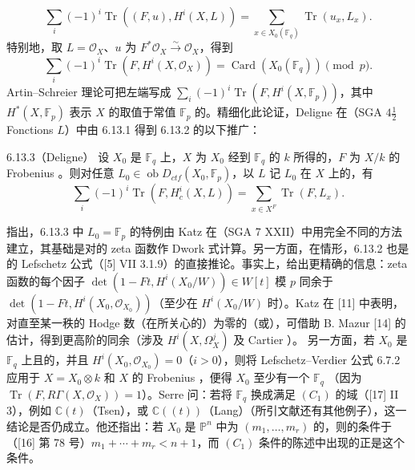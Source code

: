 \[\sum_i(-1)^i\operatorname{Tr}((F,u),H^i(X,L))=\sum_{x\in X_0(\mathbb F_q)}\operatorname{Tr}(u_x,L_x).\tag{6.13.1}\]
特别地，取 $L=\mathcal O_X$、$u$ 为 $F^*\mathcal O_X\xrightarrow\sim\mathcal O_X$，得到
\[\sum_i(-1)^i\operatorname{Tr}(F,H^i(X,\mathcal O_X))=\operatorname{Card}(X_0(\mathbb F_q))\pmod p.\tag{6.13.2}\]
Artin--Schreier 理论可把左端写成 $\sum_i(-1)^i\operatorname{Tr}(F,H^i(X,\mathbb F_p))$，其中 $H^*(X,\mathbb F_p)$ 表示 $X$ 的取值于常值 $\mathbb F_p$ 的。精细化此论证，Deligne 在（SGA $4\frac12$ Fonctions $L$）中由 6.13.1 得到 6.13.2 的以下推广：
\begin{SGAresult}{}{6.13.3（Deligne）}
设 $X_0$ 是 $\mathbb F_q$ 上，$X$ 为 $X_0$ 经到 $\mathbb F_q$ 的 $k$ 所得的，$F$ 为 $X/k$ 的 Frobenius 。则对任意 $L_0\in\operatorname{ob}D_{ctf}(X_0,\mathbb F_p)$，以 $L$ 记 $L_0$ 在 $X$ 上的，有
\[\sum_i(-1)^i\operatorname{Tr}(F,H_c^i(X,L))=\sum_{x\in X^F}\operatorname{Tr}(F,L_x).\]
\end{SGAresult}
指出，6.13.3 中 $L_0=\mathbb F_p$ 的特例由 Katz 在（SGA 7 XXII）中用完全不同的方法建立，其基础是对的 zeta 函数作 Dwork 式计算。另一方面，在情形，6.13.2 也是的 Lefschetz 公式（[5] VII 3.1.9）的直接推论。事实上，给出更精确的信息：zeta 函数的每个因子 $\det(1-Ft,H^i(X_0/W))\in W[t]$ 模 $p$ 同余于 $\det(1-Ft,H^i(X_0,\mathcal O_{X_0}))$（至少在 $H^i(X_0/W)$ 时）。Katz 在 [11] 中表明，对直至某一秩的 Hodge 数（在所关心的）为零的（或），可借助 B. Mazur [14] 的估计，得到更高阶的同余（涉及 $H^i(X,\Omega_X^j)$ 及 Cartier ）。
另一方面，若 $X_0$ 是 $\mathbb F_q$ 上且的，并且 $H^i(X_0,\mathcal O_{X_0})=0$（$i>0$），则将 Lefschetz--Verdier 公式 6.7.2 应用于 $X=X_0\otimes k$ 和 $X$ 的 Frobenius ，便得 $X_0$ 至少有一个 $\mathbb F_q$ （因为 $\operatorname{Tr}(F,R\Gamma(X,\mathcal O_X))=1$）。Serre 问：若将 $\mathbb F_q$ 换成满足 $(C_1)$ 的域（[17] II 3），例如 $\mathbb C(t)$（Tsen），或 $\mathbb C((t))$（Lang）（所引文献还有其他例子），这一结论是否仍成立。他还指出：若 $X_0$ 是 $\mathbb P^n$ 中为 $(m_1,\ldots,m_r)$ 的，则的条件于（[16] 第 78 号）$m_1+\cdots+m_r<n+1$，而 $(C_1)$ 条件的陈述中出现的正是这个条件。
